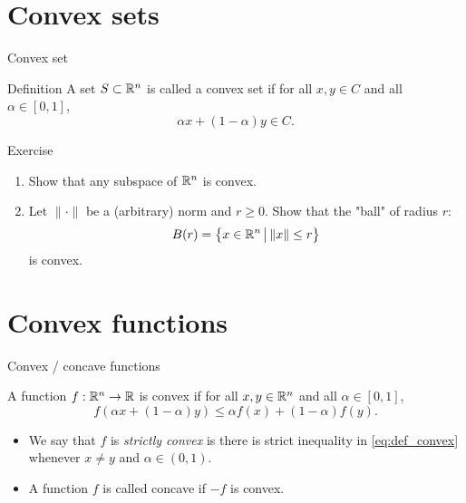 \documentclass{beamer}
\begin{document}
\section{Convex sets}

\begin{frame}[t]{Convex set}
	\grid

	\begin{block}{Definition}
		A set $S \subset \mathbb{R}^n$ is called a convex set if for all $x,y \in C$ and all $\alpha \in [0,1]$,
		$$
		\alpha x + (1-\alpha) y \in C.
		$$
	\end{block}

\end{frame}

\begin{frame}[t]{Exercise}
	\grid

	\begin{enumerate}
		\item Show that any subspace of $\mathbb{R}^n$ is convex.
		\item Let $\| \cdot \|$ be a (arbitrary) norm and $r \geq 0$.
			Show that the "ball" of radius $r$:
			$$
			B(r) = \big\{ x \in \mathbb{R}^n \, \big| \, \|x\| \leq r \big\}
			$$
			is convex.
	\end{enumerate}

\end{frame}

\section{Convex functions}

\begin{frame}[t]{Convex / concave functions}
	\grid

	\vspace{-0.4cm}

	\begin{definition}
		A function $f: \mathbb{R}^n \to \mathbb{R}$ is convex if for all $x,y \in \mathbb{R}^n$ and all $\alpha \in [0,1]$,
		\begin{equation}\label{eq:def_convex}
			f(\alpha x + (1-\alpha) y) \leq \alpha f(x) + (1-\alpha) f(y).
		\end{equation}
	\end{definition}
	\begin{itemize}
		\item We say that $f$ is \emph{strictly convex} is there is strict inequality in \eqref{eq:def_convex} whenever $x \neq y$ and $\alpha \in (0,1)$.
		\item A function $f$ is called concave if $-f$ is convex.
	\end{itemize}
\end{frame}
\end{document}
